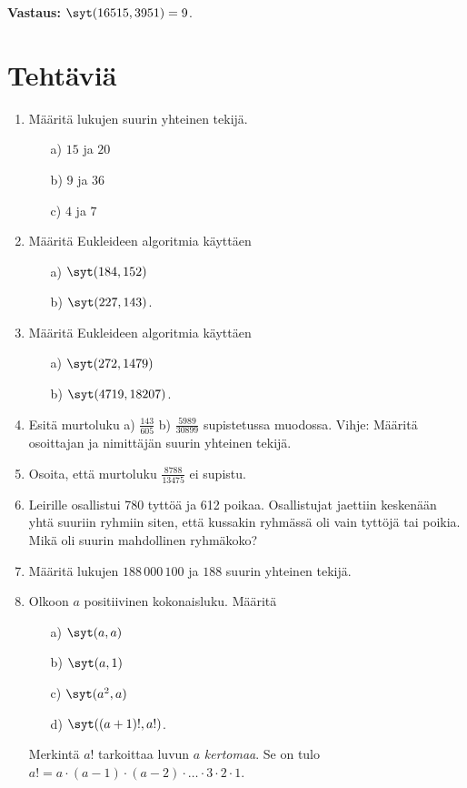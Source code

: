 {\bf Vastaus:} $\syt(16515, 3951) = 9$.

\newpage


\section*{Tehtäviä}

\begin{enumerate}

\item Määritä lukujen suurin yhteinen tekijä.
\begin{itemize}
\item[a)] $15$ ja $20$
\item[b)] $9$ ja $36$
\item[c)] $4$ ja $7$
\end{itemize}

\item Määritä Eukleideen algoritmia käyttäen
\begin{itemize}
\item[a)] $\syt(184,152)$
\item[b)] $\syt(227,143)$.
\end{itemize}

\item Määritä Eukleideen algoritmia käyttäen
\begin{itemize}
\item[a)] $\syt(272,1479)$
\item[b)] $\syt(4719,18207)$.
\end{itemize}

\item Esitä murtoluku  a) $\frac{143}{605}$  b) $\frac{5989}{30899}$  supistetussa muodossa. Vihje: Määritä osoittajan ja nimittäjän suurin yhteinen tekijä.

\item Osoita, että murtoluku $\frac{8788}{13475}$ ei supistu.

\item Leirille osallistui 780 tyttöä ja 612 poikaa. Osallistujat jaettiin keskenään yhtä suuriin ryhmiin siten, että kussakin ryhmässä oli vain tyttöjä tai poikia. Mikä oli suurin mahdollinen ryhmäkoko?

\item
Määritä lukujen $188\, 000\, 100$ ja $188$ suurin yhteinen tekijä.

\item Olkoon $a$ positiivinen kokonaisluku. Määritä
\begin{itemize}
\item[a)] $\syt(a,a)$
\item[b)] $\syt(a,1)$
\item[c)] $\syt(a^2,a)$
\item[d)] $\syt((a+1)!,a!)$.
\end{itemize}
Merkintä $a!$ tarkoittaa luvun $a$ {\em kertomaa}. Se on tulo $a! = a \cdot (a-1) \cdot (a-2) \cdot \ldots \cdot 3 \cdot 2 \cdot 1$.


\end{enumerate}
